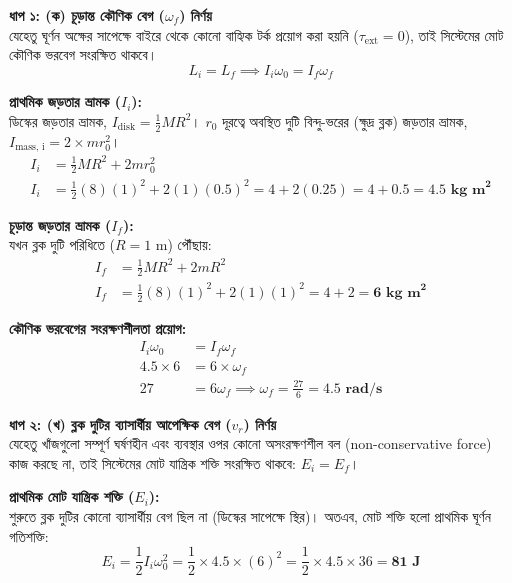 \documentclass[12pt, a4paper]{article}
\begin{document}
\begin{tcolorbox}[solutionbox={সমাধান (Solution)}]
\noindent
\textbf{ধাপ ১: (ক) চূড়ান্ত কৌণিক বেগ ($\omega_f$) নির্ণয়} \\
যেহেতু ঘূর্ণন অক্ষের সাপেক্ষে বাইরে থেকে কোনো বাহ্যিক টর্ক প্রয়োগ করা হয়নি ($\tau_{\text{ext}} = 0$), তাই সিস্টেমের মোট কৌণিক ভরবেগ সংরক্ষিত থাকবে। 
\[ L_i = L_f \implies I_i \omega_0 = I_f \omega_f \]

\textbf{প্রাথমিক জড়তার ভ্রামক ($I_i$):} \\
ডিস্কের জড়তার ভ্রামক, $I_{\text{disk}} = \frac{1}{2}MR^2$। $r_0$ দূরত্বে অবস্থিত দুটি বিন্দু-ভরের (ক্ষুদ্র ব্লক) জড়তার ভ্রামক, $I_{\text{mass, i}} = 2 \times m r_0^2$।
\begin{align*}
    I_i &= \frac{1}{2}MR^2 + 2m r_0^2 \\
    I_i &= \frac{1}{2}(8)(1)^2 + 2(1)(0.5)^2 = 4 + 2(0.25) = 4 + 0.5 = \mathbf{4.5 \text{ kg m}^2}
\end{align*}

\textbf{চূড়ান্ত জড়তার ভ্রামক ($I_f$):} \\
যখন ব্লক দুটি পরিধিতে ($R = 1\text{ m}$) পৌঁছায়:
\begin{align*}
    I_f &= \frac{1}{2}MR^2 + 2m R^2 \\
    I_f &= \frac{1}{2}(8)(1)^2 + 2(1)(1)^2 = 4 + 2 = \mathbf{6 \text{ kg m}^2}
\end{align*}

\textbf{কৌণিক ভরবেগের সংরক্ষণশীলতা প্রয়োগ:}
\begin{align*}
    I_i \omega_0 &= I_f \omega_f \\
    4.5 \times 6 &= 6 \times \omega_f \\
    27 &= 6 \omega_f \implies \omega_f = \frac{27}{6} = \mathbf{4.5 \text{ rad/s}}
\end{align*}

\vspace{1em}
\noindent
\textbf{ধাপ ২: (খ) ব্লক দুটির ব্যাসার্ধীয় আপেক্ষিক বেগ ($v_r$) নির্ণয়} \\
যেহেতু খাঁজগুলো সম্পূর্ণ ঘর্ষণহীন এবং ব্যবস্থার ওপর কোনো অসংরক্ষণশীল বল (non-conservative force) কাজ করছে না, তাই সিস্টেমের মোট যান্ত্রিক শক্তি সংরক্ষিত থাকবে: $E_i = E_f$।

\textbf{প্রাথমিক মোট যান্ত্রিক শক্তি ($E_i$):} \\
শুরুতে ব্লক দুটির কোনো ব্যাসার্ধীয় বেগ ছিল না (ডিস্কের সাপেক্ষে স্থির)। অতএব, মোট শক্তি হলো প্রাথমিক ঘূর্ণন গতিশক্তি:
\[ E_i = \frac{1}{2}I_i \omega_0^2 = \frac{1}{2} \times 4.5 \times (6)^2 = \frac{1}{2} \times 4.5 \times 36 = \mathbf{81 \text{ J}} \]


\end{tcolorbox}
\end{document}
